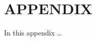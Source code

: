 \documentclass[prodmode,acmtochi]{acmsmall} %
\begin{document}






%
%
%
%
%
%
%
%
%

\appendix
\section*{APPENDIX}
\setcounter{section}{1}
In this appendix \ldots
{}
\end{document}
